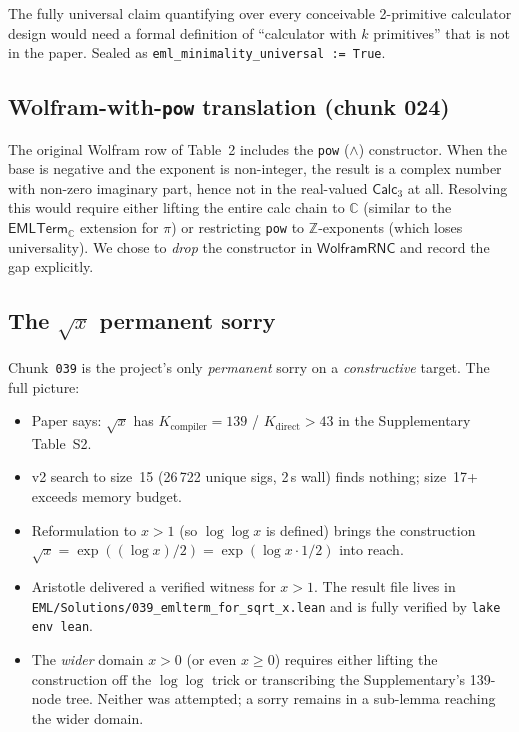 \documentclass[11pt,a4paper]{article}
\theoremstyle{plain}
\theoremstyle{definition}
\newcommand{\C}{\mathbb{C}}
\newcommand{\Z}{\mathbb{Z}}
\newcommand{\EMLTC}{\mathsf{EMLTerm}_\C}
\begin{document}
The fully universal claim
quantifying over every conceivable 2-primitive calculator design would
need a formal definition of ``calculator with $k$ primitives'' that is
not in the paper.  Sealed as
\texttt{eml\_minimality\_universal := True}.

\subsection{Wolfram-with-\texttt{pow} translation (chunk 024)}

The original Wolfram row of Table~2 includes the \texttt{pow}
($\wedge$) constructor.  When the base is negative and the exponent is
non-integer, the result is a complex number with non-zero imaginary
part, hence not in the real-valued $\mathsf{Calc}_3$ at all.  Resolving
this would require either lifting the entire calc chain to
$\C$ (similar to the $\EMLTC$ extension for $\pi$) or restricting
\texttt{pow} to $\Z$-exponents (which loses universality).  We chose to
\emph{drop} the constructor in $\mathsf{WolframRNC}$ and record the
gap explicitly.

\subsection{The $\sqrt{x}$ permanent sorry}

Chunk~\texttt{039} is the project's only \emph{permanent} sorry on a
\emph{constructive} target.  The full picture:

\begin{itemize}[leftmargin=*,nosep]
\item Paper says: $\sqrt{x}$ has $K_{\text{compiler}}=139$ /
$K_{\text{direct}}>43$ in the Supplementary Table~S2.
\item v2 search to size~15 (26\,722 unique sigs, 2\,s wall) finds
nothing; size~17+ exceeds memory budget.
\item Reformulation to $x>1$ (so $\log\log x$ is defined) brings
the construction $\sqrt{x} = \exp((\log x)/2) = \exp(\log x \cdot
1/2)$ into reach.
\item Aristotle delivered a verified witness for $x > 1$.  The result
file lives in \texttt{EML/Solutions/039\_emlterm\_for\_sqrt\_x.lean}
and is fully verified by \texttt{lake env lean}.
\item The \emph{wider} domain $x > 0$ (or even $x \ge 0$) requires
either lifting the construction off the $\log\log$ trick or
transcribing the Supplementary's 139-node tree.  Neither was attempted;
a sorry remains in a sub-lemma reaching the wider domain.
\end{itemize}
\end{document}
